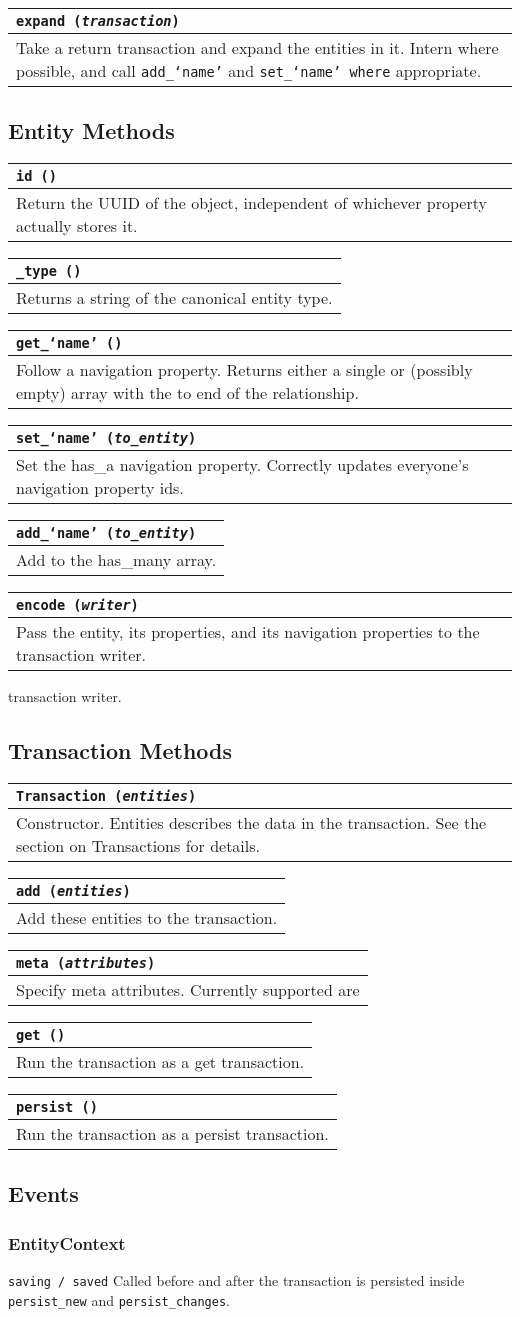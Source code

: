 \documentclass{article}
\newcommand{\ilcode}{\tt}
\newcommand{\method}[4]{
	\begin{tabular}{ | l | p{6in} | }
	\hline
	\multicolumn{2}{|l|}{\ilcode #1 ({\it #2})} \\
	\hline
	\multicolumn{2}{|p{7in}|}{#3} \\
	\hline
	#4
	\end{tabular}
}
\begin{document}
	\method{expand}{transaction}
		{Take a return transaction and expand the entities in it. Intern where
		possible, and call {\ilcode add\_`name'} and {\ilcode set\_`name' where}
		appropriate.}{}

\subsection{Entity Methods}
	\method{id}{}
		{Return the UUID of the object, independent of whichever property
				actually stores it.}{}

	\method{\_type}{}
		{Returns a string of the canonical entity type.}{}

	\method{get\_`name'}{}
		{Follow a navigation property. Returns either a single or (possibly
				empty) array with the to end of the relationship.}{}

	\method{set\_`name'}{to\_entity}
		{Set the has\_a navigation property. Correctly updates everyone's
				navigation property ids.}{}

	\method{add\_`name'}{to\_entity}
		{Add to the has\_many array.}{}

	\method{encode}{writer}
		{Pass the entity, its properties, and its navigation properties to the
				transaction writer.}{}
		transaction writer.

\subsection{Transaction Methods}
	\method{Transaction}{entities}
		{Constructor. Entities describes the data in the transaction. See the
				section on Transactions for details.}{}

	\method{add}{entities}
		{Add these entities to the transaction.}{}

	\method{meta}{attributes}
		{Specify meta attributes. Currently supported are}{}

	\method{get}{}
		{Run the transaction as a get transaction.}{}

	\method{persist}{}
		{Run the transaction as a persist transaction.}{}

\subsection{Events}
\subsubsection{EntityContext}
{\ilcode saving / saved} Called before and after the transaction is persisted inside
{\ilcode persist\_new} and {\ilcode persist\_changes}.
\end{document}
